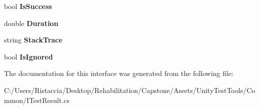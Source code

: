 \begin{DoxyCompactItemize}
bool {\bfseries Is\+Success}
\item 
\mbox{\label{interface_i_test_result_abcbc26805d421731a0a2f71620748203}} 
double {\bfseries Duration}
\item 
\mbox{\label{interface_i_test_result_a8e2b5a78c39666d98dbd219d247ea314}} 
string {\bfseries Stack\+Trace}
\item 
\mbox{\label{interface_i_test_result_a6ba70055c94baaed47cc75ff746d4f27}} 
bool {\bfseries Is\+Ignored}
\end{DoxyCompactItemize}


The documentation for this interface was generated from the following file\+:\begin{DoxyCompactItemize}
\item 
C\+:/\+Users/\+Ristaccia/\+Desktop/\+Rehabilitation/\+Capstone/\+Assets/\+Unity\+Test\+Tools/\+Common/I\+Test\+Result.\+cs\end{DoxyCompactItemize}
